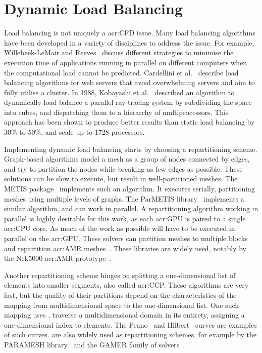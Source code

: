 \section{Dynamic Load Balancing}\label{section:literature_review:load_balancing}

Load balancing is not uniquely a \acrshort{acr:CFD} issue. Many load balancing algorithms have been
developed in a variety of disciplines to address the issue. For example, Willebeek-LeMair and
Reeves~\cite{Willebeek1993} discuss different strategies to minimise the execution time of
applications running in parallel on different computers when the computational load cannot be
predicted. Cardellini et al.~\cite{Cardellini1999} describe load balancing algorithms for web
servers that avoid overwhelming servers and aim to fully utilise a cluster. In 1988, Kobayashi et
al.~\cite{Kobayashi1988} described an algorithm to dynamically load balance a parallel ray-tracing
system by subdividing the space into cubes, and dispatching them to a hierarchy of multiprocessors.
This approach has been shown to produce better results than static load balancing by \(30 \% \) to
\(50 \% \), and scale up to 1728 processors.

Implementing dynamic load balancing starts by choosing a repartitioning scheme. Graph-based
algorithms model a mesh as a group of nodes connected by edges, and try to partition the nodes while
breaking as few edges as possible. These solutions can be slow to execute, but result in
well-partitioned meshes. The METIS package~\cite{Karypis1997} implements such an algorithm. It
executes serially, partitioning meshes using multiple levels of graphs. The ParMETIS
library~\cite{Karypis1997P} implements a similar algorithm, and can work in parallel. A
repartitioning algorithm working in parallel is highly desirable for this work, as each
\acrshort{acr:GPU} is paired to a single \acrshort{acr:CPU} core. As much of the work as possible
will have to be executed in parallel on the \acrshort{acr:GPU}. These solvers can partition meshes
to multiple blocks and repartition \acrshort{acr:AMR} meshes~\cite{Karypis1997P}. These libraries
are widely used, notably by the Nek5000 \acrshort{acr:AMR} prototype~\cite{Peplinski2016}.

Another repartitioning scheme hinges on splitting a one-dimensional list of elements into smaller
segments, also called \acrfull{acr:CCP}. These algorithms are very fast, but the quality of their
partitions depend on the characteristics of the mapping from multidimensional space to the
one-dimensional list. One such mapping uses .  traverse a
multidimensional domain in its entirety, assigning a one-dimensional index to elements. The
Peano~\cite{Peano1890} and Hilbert~\cite{Hilbert1891} curves are examples of such curves.
 are also widely used as repartitioning schemes, for example by the PARAMESH
library~\cite{MacNeice2000} and the GAMER family of solvers~\cite{Schive2018}.

